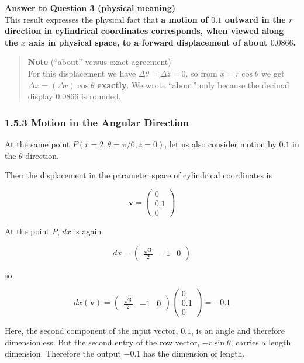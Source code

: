 \textbf{Answer to Question 3 (physical meaning)}\\
This result expresses the physical fact that \textbf{a motion of \(0.1\)
outward in the \(r\) direction in cylindrical coordinates corresponds,
when viewed along the \(x\) axis in physical space, to a forward
displacement of about \(0.0866\).}

\begin{quote}
\textbf{Note} (``about'' versus exact agreement)\\
For this displacement we have \(\Delta\theta=\Delta z=0\), so from
\(x=r\cos\theta\) we get \(\Delta x=(\Delta r)\cos\theta\)
\textbf{exactly}. We wrote ``about'' only because the decimal display
\(0.0866\) is rounded.
\end{quote}

\hypertarget{motion-in-the-angular-direction}{%
\subsubsection{1.5.3 Motion in the Angular
Direction}\label{motion-in-the-angular-direction}}

At the same point \(P(r=2,\theta=\pi/6,z=0)\), let us also consider
motion by \(0.1\) in the \(\theta\) direction.

Then the displacement in the parameter space of cylindrical coordinates
is

\[
\mathbf{v}
=
\begin{pmatrix}
0\\
0.1\\
0
\end{pmatrix}
\]

At the point \(P\), \(dx\) is again

\[
dx
=
\begin{pmatrix}
\frac{\sqrt{3}}{2} & -1 & 0
\end{pmatrix}
\]

so

\[
dx(\mathbf{v})
=
\begin{pmatrix}
\frac{\sqrt{3}}{2} & -1 & 0
\end{pmatrix}
\begin{pmatrix}
0\\
0.1\\
0
\end{pmatrix}
=
-0.1
\]

Here, the second component of the input vector, \(0.1\), is an angle and
therefore dimensionless. But the second entry of the row vector,
\(-r\sin\theta\), carries a length dimension. Therefore the output
\(-0.1\) has the dimension of length.

